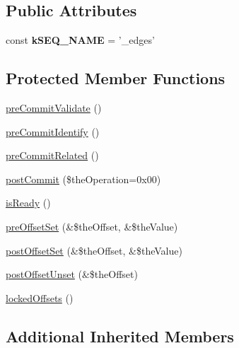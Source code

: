 \subsection*{Public Attributes}
\begin{DoxyCompactItemize}
\item 
\hypertarget{class_ontology_wrapper_1_1_edge_af0a68ad0c816d7efde12dc4962ffa039}{const {\bfseries k\-S\-E\-Q\-\_\-\-N\-A\-M\-E} = '\-\_\-edges'}\label{class_ontology_wrapper_1_1_edge_af0a68ad0c816d7efde12dc4962ffa039}

\end{DoxyCompactItemize}
\subsection*{Protected Member Functions}
\begin{DoxyCompactItemize}
\item 
\hyperlink{class_ontology_wrapper_1_1_edge_a0e03203a25cb833e1c813e840d8357b9}{pre\-Commit\-Validate} ()
\item 
\hyperlink{class_ontology_wrapper_1_1_edge_a589e95a446b849c6ef89e9901d51f45a}{pre\-Commit\-Identify} ()
\item 
\hyperlink{class_ontology_wrapper_1_1_edge_acf5f31f23a430835f56de8493614415f}{pre\-Commit\-Related} ()
\item 
\hyperlink{class_ontology_wrapper_1_1_edge_a1eda20b86f5bad5901332a61b2a2373c}{post\-Commit} (\$the\-Operation=0x00)
\item 
\hyperlink{class_ontology_wrapper_1_1_edge_a15832a03eb158f3c1ed72bf0aeee7686}{is\-Ready} ()
\item 
\hyperlink{class_ontology_wrapper_1_1_edge_a057f0d70304b17867533bdc5f3f6e3c5}{pre\-Offset\-Set} (\&\$the\-Offset, \&\$the\-Value)
\item 
\hyperlink{class_ontology_wrapper_1_1_edge_a4a58b988123053bffe0dc3cab828d471}{post\-Offset\-Set} (\&\$the\-Offset, \&\$the\-Value)
\item 
\hyperlink{class_ontology_wrapper_1_1_edge_a16c9a301e4cd9db2ad89526abc7fde23}{post\-Offset\-Unset} (\&\$the\-Offset)
\item 
\hyperlink{class_ontology_wrapper_1_1_edge_a4ebc54fd09b9565562da5dcbd2012edb}{locked\-Offsets} ()
\end{DoxyCompactItemize}
\subsection*{Additional Inherited Members}


